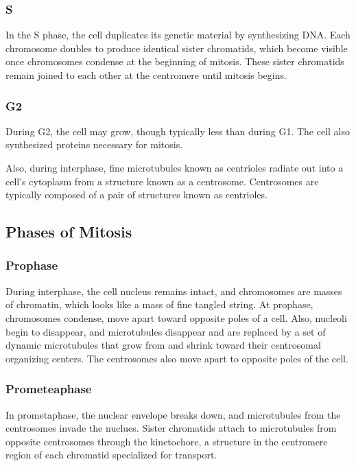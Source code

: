 \documentclass[12pt,titlepage]{article}
\begin{document}
        \subsubsection{S}
          In the S phase, the cell duplicates its genetic material by synthesizing DNA. Each chromosome doubles to produce identical sister chromatids, which become
          visible once chromosomes condense at the beginning of mitosis. These sister chromatids remain joined to each other at the centromere until mitosis begins.

        \subsubsection{G2}
          During G2, the cell may grow, though typically less than during G1. The cell also synthesized proteins necessary for mitosis.

        Also, during interphase, fine microtubules known as centrioles radiate out into a cell's cytoplasm from a structure known as a centrosome. Centrosomes are
        typically composed of a pair of structures known as centrioles.

      \subsection{Phases of Mitosis}

        \subsubsection{Prophase}
          During interphase, the cell nucleus remains intact, and chromosomes are masses of chromatin, which looks like a mass of fine tangled string. At prophase,
          chromosomes condense, move apart toward opposite poles of a cell. Also, nucleoli begin to disappear, and microtubules disappear and are replaced by a
          set of dynamic microtubules that grow from and shrink toward their centrosomal organizing centers. The centrosomes also move apart to opposite poles of the
          cell.

        \subsubsection{Prometeaphase}
          In prometaphase, the nuclear envelope breaks down, and microtubules from the centrosomes invade the nuclues. Sister chromatids attach to microtubules from
          opposite centrosomes through the kinetochore, a structure in the centromere region of each chromatid specialized for transport.
\end{document}
